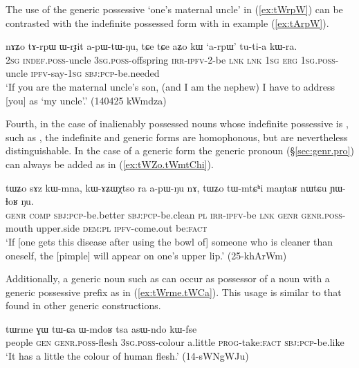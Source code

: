 The use of the generic possessive  `one's maternal uncle' in (\ref{ex:tWrpW}) can be contrasted with the indefinite possessed form with  in example (\ref{ex:tArpW}).

\begin{exe}
\ex \label{ex:tArpW}
\gll nɤʑo tɤ-rpɯ ɯ-rɟit a-pɯ-tɯ-ŋu, tɕe tɕe aʑo kɯ `a-rpɯ' tu-ti-a kɯ-ra. \\
\textsc{2sg} \textsc{indef}.\textsc{poss}-uncle \textsc{3sg}.\textsc{poss}-offspring \textsc{irr}-\textsc{ipfv}-2-be \textsc{lnk} \textsc{lnk} \textsc{1sg} \textsc{erg} \textsc{1sg}.\textsc{poss}-uncle \textsc{ipfv}-say-\textsc{1sg} \textsc{sbj}:\textsc{pcp}-be.needed \\
\glt `If you are the maternal uncle's son, (and I am the nephew) I have to address [you] as `my uncle'.' (140425 kWmdza)
\end{exe}

Fourth, in the case of inalienably possessed nouns whose indefinite possessive is , such as , the indefinite and generic forms are homophonous, but are nevertheless distinguishable. In the case of a generic form the generic pronoun  (§\ref{sec:genr.pro}) can always be added as in (\ref{ex:tWZo.tWmtChi}). 

\begin{exe}
\ex \label{ex:tWZo.tWmtChi}
\gll tɯʑo sɤz kɯ-mna, kɯ-ɤʑɯχtso ra a-pɯ-ŋu nɤ, tɯʑo tɯ-mtɕʰi maŋtaʁ nɯtɕu ɲɯ-ɬoʁ ŋu. \\
\textsc{genr} \textsc{comp} \textsc{sbj}:\textsc{pcp}-be.better \textsc{sbj}:\textsc{pcp}-be.clean \textsc{pl} \textsc{irr}-\textsc{ipfv}-be \textsc{lnk} \textsc{genr} \textsc{genr}.\textsc{poss}-mouth upper.side \textsc{dem}:\textsc{pl} \textsc{ipfv}-come.out be:\textsc{fact} \\
\glt `If [one gets this disease after using the bowl of] someone who is cleaner than oneself, the [pimple] will appear on one's upper lip.' (25-khArWm)
\end{exe}

Additionally, a generic noun such as  can occur as possessor of a noun with a generic possessive prefix as in (\ref{ex:tWrme.tWCa}). This usage is similar to that found in other generic constructions.

\begin{exe}
\ex \label{ex:tWrme.tWCa}
\gll tɯrme ɣɯ tɯ-ɕa ɯ-mdoʁ tsa asɯ-ndo kɯ-fse \\
people \textsc{gen} \textsc{genr}.\textsc{poss}-flesh \textsc{3sg}.\textsc{poss}-colour a.little \textsc{prog}-take:\textsc{fact} \textsc{sbj}:\textsc{pcp}-be.like \\
\glt `It has a little the colour of human flesh.' (14-sWNgWJu)
\end{exe}

